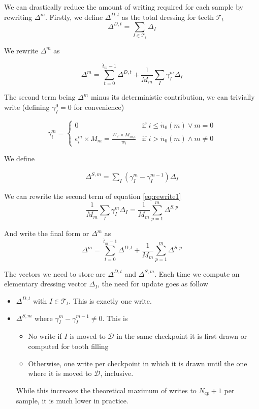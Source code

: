 \documentclass[./thesis.tex]{subfiles}
\begin{document}
We can drastically reduce the amount of writing required for each sample by rewriting $\Delta^m$.
Firstly, we define $\Delta^{D,t}$ as the total dressing for teeth $\mathcal{T}_t$
\begin{equation}
\Delta^{D,t} = \sum_{I \in \mathcal{T}_t} \Delta_I
\end{equation}

We rewrite $\Delta^m$ as

\begin{equation}
\label{eq:rewrite1}
\Delta^{m} = \sum_{t=0}^{\dot t_m - 1} \Delta^{D,t}+ \frac{1}{M_m} \sum_{I} \gamma^m_{I} \Delta_I
\end{equation}

The second term being $\Delta^m$ minus its deterministic contribution, we can trivially write (defining $\gamma^ 0_I=0$ for convenience)

\begin{equation}
\gamma^m_i = 
\begin{cases}
0 & \text{if } i \leq \dot n_0(m) \vee m=0 \\
\epsilon^m_i \times M_m = \frac{W_T \times M_{m,i}}{w_i} & \text{if } i > \dot n_0(m) \wedge m \neq 0
\end{cases}
\end{equation}

We define

\begin{align}
\Delta^{S,m} = \sum_I (\gamma^m_I - \gamma^{m-1}_I) \Delta_I
\end{align}


We can rewrite the second term of equation \ref{eq:rewrite1}
\begin{equation}
\frac{1}{M_m}\sum_{I} \gamma^m_{I} \Delta_I = \frac{1}{M_m} \sum_{p=1}^m \Delta^{S,p}
\end{equation}

And write the final form or $\Delta^m$ as
\begin{equation}
\Delta^m=\sum_{t=0}^{\dot t_{m}-1} \Delta^{D,t} + \frac{1}{M_m} \sum_{p=1}^m \Delta^{S,p}
\end{equation}

The vectors we need to store are $\Delta^{D,t}$ and $\Delta^{S,m}$. Each time we compute an elementary dressing vector $\Delta_I$, the need for update goes as follow

\begin{itemize}
\item
$\Delta^{D,t}$ with $I \in \mathcal{T}_t$. This is exactly one write.
\item
$\Delta^{S,m}$ where $\gamma^m_I - \gamma^{m-1}_I \neq 0$. This is
 \begin{itemize}
 \item
 	No write if $I$ is moved to $\mathcal{D}$ in the same checkpoint it is first drawn or computed for tooth filling
 \item
 	Otherwise, one write per checkpoint in which it is drawn until the one where it is moved to $\mathcal{D}$, inclusive.
 \end{itemize}
 While this increases the theoretical maximum of writes to $N_{cp}+1$ per sample, it is much lower in practice.
\end{itemize}
\end{document}
